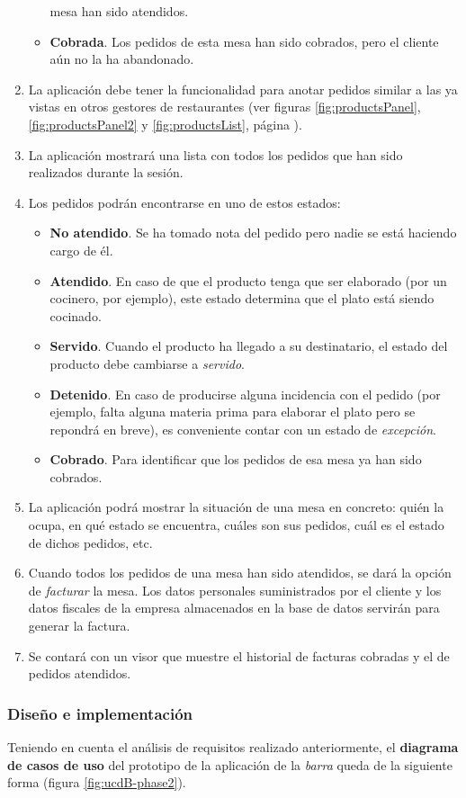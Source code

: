 \begin{enumerate}
\begin{itemize}
  mesa han sido atendidos.
  \item \textbf{Cobrada}. Los pedidos de esta mesa han sido cobrados, pero el
  cliente aún no la ha abandonado.
  \end{itemize}
\item La aplicación debe tener la funcionalidad para anotar pedidos similar a 
las ya vistas en otros gestores de restaurantes (ver figuras
\ref{fig:productsPanel}, \ref{fig:productsPanel2} y \ref{fig:productsList},
página \pageref{fig:productsPanel}).
\item La aplicación mostrará una lista con todos los pedidos que han sido
realizados durante la sesión.
\item Los pedidos podrán encontrarse en uno de estos estados:
  \begin{itemize}
  \item \textbf{No atendido}. Se ha tomado nota del pedido pero nadie se está
  haciendo cargo de él.
  \item \textbf{Atendido}. En caso de que el producto tenga que ser elaborado
  (por un cocinero, por ejemplo), este estado determina que el plato está
  siendo cocinado.
  \item \textbf{Servido}. Cuando el producto ha llegado a su destinatario, el
  estado del producto debe cambiarse a \emph{servido}.
  \item \textbf{Detenido}. En caso de producirse alguna incidencia con el
  pedido (por ejemplo, falta alguna materia prima para elaborar
  el plato pero se repondrá en breve), es conveniente contar con un estado
  de \emph{excepción}.
  \item \textbf{Cobrado}. Para identificar que los pedidos de esa mesa ya han
  sido cobrados.
  \end{itemize}
\item La aplicación podrá mostrar la situación de una mesa en concreto: quién
la ocupa, en qué estado se encuentra, cuáles son sus pedidos, cuál es el
estado de dichos pedidos, etc.
\item Cuando todos los pedidos de una mesa han sido atendidos, se dará la
opción de \emph{facturar} la mesa. Los datos personales suministrados por el
cliente y los datos fiscales de la empresa almacenados en la base de datos
servirán para generar la factura.
\item Se contará con un visor que muestre el historial de facturas cobradas y
el de pedidos atendidos.
\end{enumerate}
\newpage
\subsubsection{Diseño e implementación}
Teniendo en cuenta el análisis de requisitos realizado anteriormente, el
\textbf{diagrama de casos de uso} del prototipo de la aplicación de la
\emph{barra} queda de la siguiente forma (figura \ref{fig:ucdB-phase2}).

